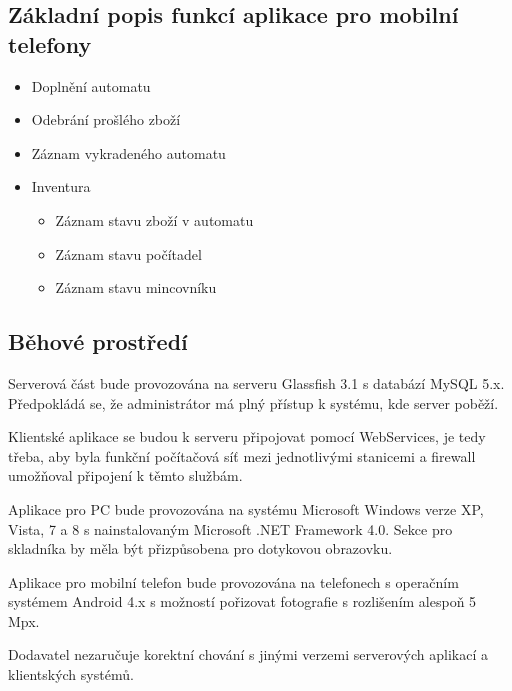 \documentclass[a4paper,10pt]{article}
\begin{document}
\subsection{Základní popis funkcí aplikace pro mobilní telefony}

\begin{itemize}
  \item Doplnění automatu
  \item Odebrání prošlého zboží
  \item Záznam vykradeného automatu
  \item Inventura
  \begin{itemize}
  	\item Záznam stavu zboží v automatu
  	\item Záznam stavu počítadel
  	\item Záznam stavu mincovníku
  \end{itemize}
\end{itemize}

\subsection{Běhové prostředí}
Serverová část bude provozována na serveru Glassfish 3.1 s databází MySQL 5.x. Předpokládá se, že administrátor má plný přístup k systému, kde server poběží.

Klientské aplikace se budou k serveru připojovat pomocí WebServices, je tedy třeba, aby byla funkční počítačová síť mezi jednotlivými stanicemi a firewall umožňoval připojení k těmto službám.

Aplikace pro PC bude provozována na systému Microsoft Windows verze XP, Vista, 7 a 8 s nainstalovaným Microsoft .NET Framework 4.0. Sekce pro skladníka by měla být přizpůsobena pro dotykovou obrazovku.

Aplikace pro mobilní telefon bude provozována na telefonech s operačním systémem Android 4.x s možností pořizovat fotografie s rozlišením alespoň 5 Mpx.

Dodavatel nezaručuje korektní chování s jinými verzemi serverových aplikací a
klientských systémů.
\end{document}
